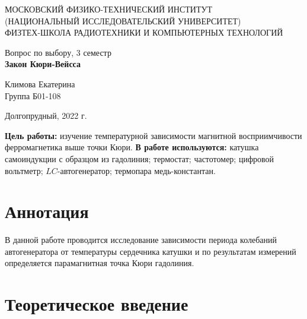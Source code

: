 \documentclass[a4paper,12pt]{article} %
\begin{document}
\begin{center}
	\footnotesize{МОСКОВСКИЙ ФИЗИКО-ТЕХНИЧЕСКИЙ ИНСТИТУТ\\(НАЦИОНАЛЬНЫЙ 			ИССЛЕДОВАТЕЛЬСКИЙ УНИВЕРСИТЕТ)}\\
	\footnotesize{ФИЗТЕХ-ШКОЛА РАДИОТЕХНИКИ И КОМПЬЮТЕРНЫХ ТЕХНОЛОГИЙ\\}
	\hfill \break
	\hfill \break
	\hfill \break
	\hfill \break
	\hfill \break
	\hfill \break
\end{center}

\begin{center}   
    \hfill \break
	\hfill \break
	\hfill \break
	\hfill \break
	\hfill \break
	\hfill \break
	\hfill \break
	\hfill \break
	\hfill \break
	\hfill \break
	\hfill \break
	\large{Вопрос по выбору, 3 семестр\\\large{\textbf{Закон Кюри-Вейсса}}}\\
	\hfill \break
	\hfill \break
	\hfill \break
	\hfill \break
	\hfill \break
	\hfill \break
	\hfill \break
	\hfill \break
	\hfill \break
	\hfill \break
	\hfill \break
	\begin{flushright}
		Климова Екатерина\\
		Группа Б01-108
	\end{flushright}
	\hfill \break
\end{center}
\hfill \break
\hfill \break
\begin{center}
	Долгопрудный, 2022 г.
\end{center}
\thispagestyle{empty}

\newpage
\hfill \break
\textbf{Цель работы:} изучение температурной зависимости магнитной восприимчивости ферромагнетика выше точки Кюри.
\hfill \break
\hfill \break
\textbf{В работе используются:} катушка самоиндукции с образцом из гадолиния; термостат; частотомер; цифровой вольтметр; $LC$-автогенератор; термопара медь-константан.

\section{Аннотация}
\hfill \break В данной работе проводится исследование зависимости периода колебаний автогенератора от температуры сердечника катушки и по результатам измерений определяется парамагнитная точка Кюри гадолиния.

\section{Теоретическое введение}
\end{document}
